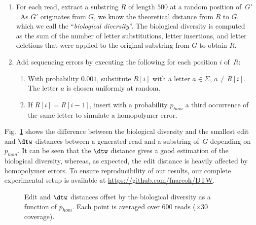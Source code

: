 \begin{enumerate} 
	\item For each read, extract a substring $R$ of length $500$ at a random position of~$G'$. As $G'$ originates from $G$, we know the theoretical distance from $R$ to $G$, which we call the ``\emph{biological diversity}''. The biological diversity is computed as the sum of the number of letter substitutions, letter insertions, and letter deletions that were applied to the original substring from $G$ to obtain $R$. 
	\item Add sequencing errors by executing the following for each position $i$ of~$R$:
	\begin{enumerate}
		\item With probability $0.001$, substitute $R[i]$ with a letter $a \in \Sigma$, $a \neq R[i]$. The letter $a$ is chosen uniformly at random.  
		\item If $R[i] = R[i-1]$, insert with a  probability $p_{hom}$ a third occurrence of the same letter to simulate a homopolymer error.
	\end{enumerate}
\end{enumerate}

Fig.~\ref{fig:experiments_N_600_max_indel_length_10} shows the difference between the biological diversity and the smallest edit and $\dtw$ distances between a generated read and a substring of~$G$ depending on $p_{hom}$. It can be seen that the $\dtw$ distance gives a good estimation of the biological diversity, whereas, as expected, the edit distance is heavily affected by homopolymer errors.  To ensure reproducibility of our results, our complete experimental setup is available at \url{https://github.com/fnareoh/DTW}.


\begin{figure}
\centering
{}
\caption{Edit and $\dtw$ distances offset by the biological diversity as a function of $p_{hom}$. Each point is averaged over 600 reads ($\times 30$ coverage).}
\label{fig:experiments_N_600_max_indel_length_10}
\end{figure}

